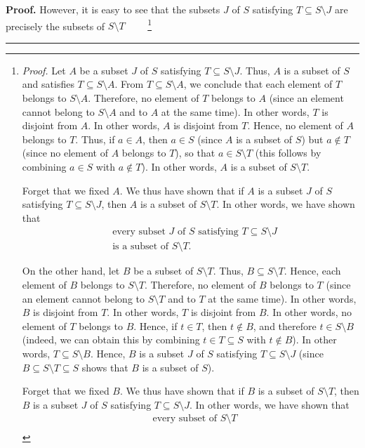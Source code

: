 \documentclass[numbers=enddot,12pt,final,onecolumn,notitlepage]{scrartcl}%
\theoremstyle{definition}
\newenvironment{proof}[1][Proof]{\noindent\textbf{#1.} }{\ \rule{0.5em}{0.5em}}
\newenvironment{verlong}{}{}
\begin{document}
\begin{verlong}
\begin{proof}
However, it is easy to see that the subsets $J$ of $S$ satisfying $T\subseteq
S\setminus J$ are precisely the subsets of $S\setminus T$%
\ \ \ \ \footnote{\textit{Proof.} Let $A$ be a subset $J$ of $S$ satisfying
$T\subseteq S\setminus J$. Thus, $A$ is a subset of $S$ and satisfies
$T\subseteq S\setminus A$. From $T\subseteq S\setminus A$, we conclude that
each element of $T$ belongs to $S\setminus A$. Therefore, no element of $T$
belongs to $A$ (since an element cannot belong to $S\setminus A$ and to $A$ at
the same time). In other words, $T$ is disjoint from $A$. In other words, $A$
is disjoint from $T$. Hence, no element of $A$ belongs to $T$. Thus, if $a\in
A$, then $a\in S$ (since $A$ is a subset of $S$) but $a\notin T$ (since no
element of $A$ belongs to $T$), so that $a\in S\setminus T$ (this follows by
combining $a\in S$ with $a\notin T$). In other words, $A$ is a subset of
$S\setminus T$.
\par
Forget that we fixed $A$. We thus have shown that if $A$ is a subset $J$ of
$S$ satisfying $T\subseteq S\setminus J$, then $A$ is a subset of $S\setminus
T$. In other words, we have shown that%
\begin{align}
&  \text{every subset }J\text{ of }S\text{ satisfying }T\subseteq S\setminus
J\nonumber\\
&  \text{is a subset of }S\setminus T. \label{pf.lem.altsum.1.long.3.pf.1}%
\end{align}
\par
On the other hand, let $B$ be a subset of $S\setminus T$. Thus, $B\subseteq
S\setminus T$. Hence, each element of $B$ belongs to $S\setminus T$.
Therefore, no element of $B$ belongs to $T$ (since an element cannot belong to
$S\setminus T$ and to $T$ at the same time). In other words, $B$ is disjoint
from $T$. In other words, $T$ is disjoint from $B$. In other words, no element
of $T$ belongs to $B$. Hence, if $t\in T$, then $t\notin B$, and therefore
$t\in S\setminus B$ (indeed, we can obtain this by combining $t\in T\subseteq
S$ with $t\notin B$). In other words, $T\subseteq S\setminus B$. Hence, $B$ is
a subset $J$ of $S$ satisfying $T\subseteq S\setminus J$ (since $B\subseteq
S\setminus T\subseteq S$ shows that $B$ is a subset of $S$).
\par
Forget that we fixed $B$. We thus have shown that if $B$ is a subset of
$S\setminus T$, then $B$ is a subset $J$ of $S$ satisfying $T\subseteq
S\setminus J$. In other words, we have shown that%
\begin{align*}
&  \text{every subset of }S\setminus T\\

\end{align*}}
\end{proof}
\end{verlong}
\end{document}
